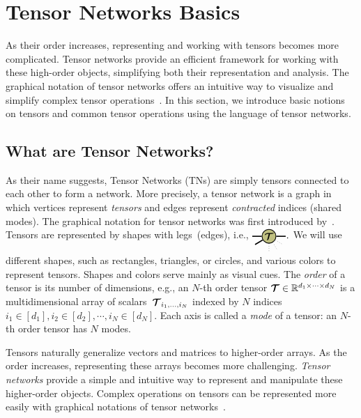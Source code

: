 \section{Tensor Networks Basics}\label{chapter:basics}

As their order increases, representing and working with tensors becomes more complicated. 
Tensor networks provide an efficient framework for working with these high-order objects, simplifying both their representation and analysis. 
The graphical notation of tensor networks offers an intuitive way to visualize and simplify complex tensor operations~\citep{orus2014practical,biamonte2017tensor}. 
In this section, we introduce basic notions on tensors and common tensor operations using the language of tensor networks.

\subsection{What are Tensor Networks?}
As their name suggests, Tensor Networks (TNs) are simply tensors connected to each other to form a network. More precisely, a tensor network is a graph in which vertices represent \emph{tensors} and edges represent \emph{contracted} indices (shared modes). The graphical notation for tensor networks was first introduced by~\cite{penrose1971applications}. Tensors are represented by shapes with legs~(edges), i.e.,
$
\begin{tikzpicture}[baseline=-0.5ex]
    \tikzset{tensor/.style = {minimum size = 0.5cm,shape = circle,thick,draw=black,inner sep = 0pt}, edge/.style = {thick,line width=.4mm},every loop/.style={}}
    \def\x{6}
    \node[tensor,fill=green!50!red!50!white] (T) at (\x,0) {$\Tt$};
    \draw[edge] (T) -- (\x-0.6,0);
    \draw[edge] (T) -- (\x+0.6,0);
    \draw[edge] (T) -- (\x-0.5,-0.3);
    \draw[dotted] (T) -- (\x,-0.6);
    \draw[dotted] (T) -- (\x+0.5,-0.3);
    \draw[dotted] (T) -- (\x+0.3,-0.5);
    \end{tikzpicture}.
$
We will use different shapes, such as rectangles, triangles, or circles, and various colors to represent tensors. Shapes and colors serve mainly as visual cues. 
The \emph{order} of a tensor is its number of dimensions, e.g., an $N$-th order tensor $\bm{\mathcal{T}}\in\mathbb{R}^{d_1\times\cdots\times d_N}$ is a multidimensional array of scalars~$\bm{\mathcal{T}}_{i_1,\dots,i_N}$ indexed by $N$ indices $i_1\in [d_1], i_2\in[d_2],\cdots, i_N \in [d_N]$. Each axis is called a \emph{mode} of a tensor: an $N$-th order tensor has $N$ modes.
 
 Tensors naturally generalize vectors and matrices to higher-order arrays. As the order increases, representing these arrays becomes more challenging. \emph{Tensor networks} provide a simple and intuitive way to represent and manipulate these higher-order objects. Complex operations on tensors can be represented more easily with graphical notations of tensor networks~\citep{biamonte2017tensor,orus2014practical}. 


